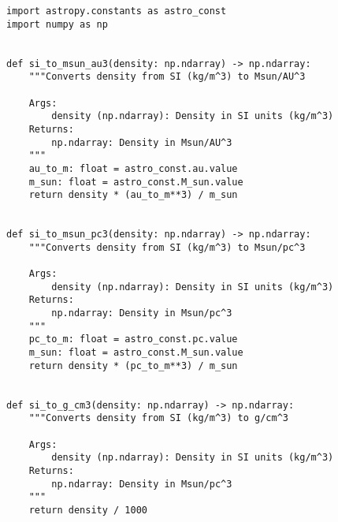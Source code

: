 \begin{lstlisting}
import astropy.constants as astro_const
import numpy as np


def si_to_msun_au3(density: np.ndarray) -> np.ndarray:
    """Converts density from SI (kg/m^3) to Msun/AU^3

    Args:
        density (np.ndarray): Density in SI units (kg/m^3)
    Returns:
        np.ndarray: Density in Msun/AU^3
    """
    au_to_m: float = astro_const.au.value
    m_sun: float = astro_const.M_sun.value
    return density * (au_to_m**3) / m_sun


def si_to_msun_pc3(density: np.ndarray) -> np.ndarray:
    """Converts density from SI (kg/m^3) to Msun/pc^3

    Args:
        density (np.ndarray): Density in SI units (kg/m^3)
    Returns:
        np.ndarray: Density in Msun/pc^3
    """
    pc_to_m: float = astro_const.pc.value
    m_sun: float = astro_const.M_sun.value
    return density * (pc_to_m**3) / m_sun


def si_to_g_cm3(density: np.ndarray) -> np.ndarray:
    """Converts density from SI (kg/m^3) to g/cm^3
    
    Args:
        density (np.ndarray): Density in SI units (kg/m^3)
    Returns:
        np.ndarray: Density in Msun/pc^3
    """
    return density / 1000
\end{lstlisting}